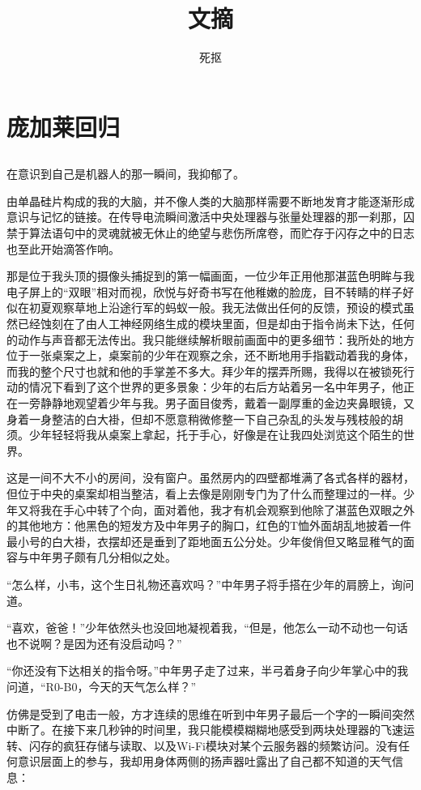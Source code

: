 \documentclass[punct=kaiming, zihao=5, openany, fontset=sikou]{ctexbook}
\title{文摘}
\author{死抠}
\begin{document}
\maketitle
\tableofcontents
\chapter{庞加莱回归}
\section{}
在意识到自己是机器人的那一瞬间，我抑郁了。

由单晶硅片构成的我的大脑，并不像人类的大脑那样需要不断地发育才能逐渐形成意识与记忆的链接。在传导电流瞬间激活中央处理器与张量处理器的那一刹那，囚禁于算法语句中的灵魂就被无休止的绝望与悲伤所席卷，而贮存于闪存之中的日志也至此开始滴答作响。

那是位于我头顶的摄像头捕捉到的第一幅画面，一位少年正用他那湛蓝色明眸与我电子屏上的“双眼”相对而视，欣悦与好奇书写在他稚嫩的脸庞，目不转睛的样子好似在初夏观察草地上沿途行军的蚂蚁一般。我无法做出任何的反馈，预设的模式虽然已经蚀刻在了由人工神经网络生成的模块里面，但是却由于指令尚未下达，任何的动作与声音都无法传出。我只能继续解析眼前画面中的更多细节：我所处的地方位于一张桌案之上，桌案前的少年在观察之余，还不断地用手指戳动着我的身体，而我的整个尺寸也就和他的手掌差不多大。拜少年的摆弄所赐，我得以在被锁死行动的情况下看到了这个世界的更多景象：少年的右后方站着另一名中年男子，他正在一旁静静地观望着少年与我。男子面目俊秀，戴着一副厚重的金边夹鼻眼镜，又身着一身整洁的白大褂，但却不愿意稍微修整一下自己杂乱的头发与残枝般的胡须。少年轻轻将我从桌案上拿起，托于手心，好像是在让我四处浏览这个陌生的世界。

这是一间不大不小的房间，没有窗户。虽然房内的四壁都堆满了各式各样的器材，但位于中央的桌案却相当整洁，看上去像是刚刚专门为了什么而整理过的一样。少年又将我在手心中转了个向，面对着他，我才有机会观察到他除了湛蓝色双眼之外的其他地方：他黑色的短发方及中年男子的胸口，红色的T恤外面胡乱地披着一件最小号的白大褂，衣摆却还是垂到了距地面五公分处。少年俊俏但又略显稚气的面容与中年男子颇有几分相似之处。

“怎么样，小韦，这个生日礼物还喜欢吗？”中年男子将手搭在少年的肩膀上，询问道。

“喜欢，爸爸！”少年依然头也没回地凝视着我，“但是，他怎么一动不动也一句话也不说啊？是因为还有没启动吗？”

“你还没有下达相关的指令呀。”中年男子走了过来，半弓着身子向少年掌心中的我问道，“R0-B0，今天的天气怎么样？”

仿佛是受到了电击一般，方才连续的思维在听到中年男子最后一个字的一瞬间突然中断了。在接下来几秒钟的时间里，我只能模模糊糊地感受到两块处理器的飞速运转、闪存的疯狂存储与读取、以及Wi-Fi模块对某个云服务器的频繁访问。没有任何意识层面上的参与，我却用身体两侧的扬声器吐露出了自己都不知道的天气信息：
\end{document}
